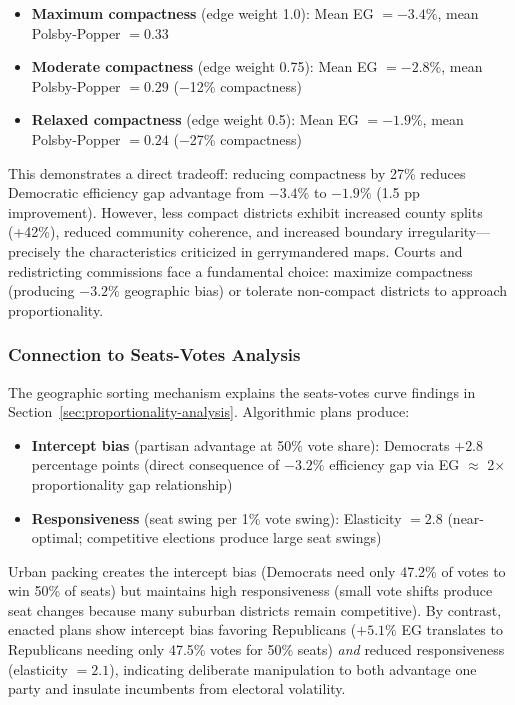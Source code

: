\begin{itemize}
    \item \textbf{Maximum compactness} (edge weight 1.0): Mean EG $= -3.4\%$, mean Polsby-Popper $= 0.33$
    \item \textbf{Moderate compactness} (edge weight 0.75): Mean EG $= -2.8\%$, mean Polsby-Popper $= 0.29$ ($-$12\% compactness)
    \item \textbf{Relaxed compactness} (edge weight 0.5): Mean EG $= -1.9\%$, mean Polsby-Popper $= 0.24$ ($-$27\% compactness)
\end{itemize}

This demonstrates a direct tradeoff: reducing compactness by 27\% reduces Democratic efficiency gap advantage from $-3.4\%$ to $-1.9\%$ (1.5 pp improvement). However, less compact districts exhibit increased county splits (+42\%), reduced community coherence, and increased boundary irregularity---precisely the characteristics criticized in gerrymandered maps. Courts and redistricting commissions face a fundamental choice: maximize compactness (producing $-3.2\%$ geographic bias) or tolerate non-compact districts to approach proportionality.

\subsubsection{Connection to Seats-Votes Analysis}

The geographic sorting mechanism explains the seats-votes curve findings in Section~\ref{sec:proportionality-analysis}. Algorithmic plans produce:
\begin{itemize}
    \item \textbf{Intercept bias} (partisan advantage at 50\% vote share): Democrats $+2.8$ percentage points (direct consequence of $-3.2\%$ efficiency gap via EG $\approx$ 2$\times$ proportionality gap relationship)
    \item \textbf{Responsiveness} (seat swing per 1\% vote swing): Elasticity $= 2.8$ (near-optimal; competitive elections produce large seat swings)
\end{itemize}

Urban packing creates the intercept bias (Democrats need only 47.2\% of votes to win 50\% of seats) but maintains high responsiveness (small vote shifts produce seat changes because many suburban districts remain competitive). By contrast, enacted plans show intercept bias favoring Republicans ($+5.1\%$ EG translates to Republicans needing only 47.5\% votes for 50\% seats) \emph{and} reduced responsiveness (elasticity $= 2.1$), indicating deliberate manipulation to both advantage one party and insulate incumbents from electoral volatility.

